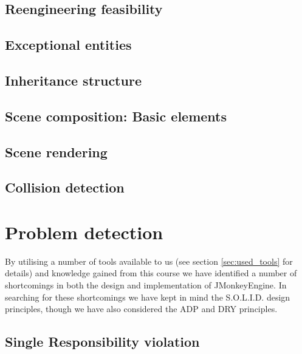 \documentclass[a4paper, 10pt]{article}
\begin{document}
\subsection{Reengineering feasibility}
\label{sec:reengineering_feasibility}


\subsection{Exceptional entities}
\label{sec:exceptional_entities}


\subsection{Inheritance structure}
\label{sec:inheritance_structure}


\subsection{Scene composition: Basic elements}
\label{sec:scene_composition}


\subsection{Scene rendering}
\label{sec:scene_rendering}


\subsection{Collision detection}
\label{sec:collision_detection}


\newpage
\section{Problem detection}
\label{sec:problem_detection}

By utilising a number of tools available to us (see section
\ref{sec:used_tools} for details) and knowledge gained from this
course we have identified a number of shortcomings in both the design
and implementation of JMonkeyEngine. In searching for these
shortcomings we have kept in mind the  S.O.L.I.D. design principles,
though we have also considered the ADP and DRY principles.

\subsection{Single Responsibility violation}
\label{sec:srp_violation}
\end{document}

